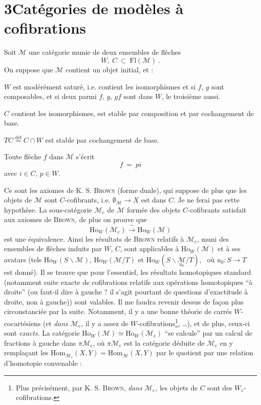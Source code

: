 \documentclass[11pt]{article}
\newcommand{\printedpage}[1]{\marginpar{\footnotesize p.~#1}}
\newcommand{\msp}[1]{\marginpar{\footnotesize [#1]}}
\newcommand{\M}{\mathcal{M}}
\newcommand{\Mc}{\mathcal{M}_{\mathrm{c}}}
\begin{document}
\section*{3\quad Catégories de modèles à cofibrations}

Soit $\M$ une catégorie munie de deux ensembles de flèches
\[ W,\ C\ \subset\ \mathrm{Fl}(\M)\ . \]
On suppose que $\M$ contient un objet initial, et :
\begin{description}[leftmargin=3em, labelwidth=2.5em]
\item[Cof$_0$] $W$ est modérément saturé, i.e. contient les isomorphismes et si $f$, $g$ sont composables, et si deux parmi $f$, $g$, $gf$ sont dans $W$, le troisième aussi.
\item[Cof$_1$] $C$ contient les isomorphismes, est stable par composition et par cochangement de base.
\item[Cof$_2$] $TC \overset{\text{déf}}{=} C \cap W$ est stable par cochangement de base.
\item[Cof$_3$] Toute flèche $f$ dans $\M$ s'écrit
\[ f \ = \ pi \]
avec $i \in C$, $p \in W$.
\end{description}
Ce sont les axiomes de K. S. \textsc{Brown} (forme duale), qui suppose de plus que les objets de $\M$ sont $C$-cofibrants, i.e. $\emptyset_{\M} \longrightarrow X$ est dans $C$. Je ne ferai pas cette hypothèse. La sous-catégorie $\Mc$ de $\M$ formée des \msp{40} objets $C$-cofibrants satisfait aux axiomes de \textsc{Brown}, de plus on prouve que
\[ \mathrm{Ho}_W(\Mc) \xrightarrow{\ \sim\ } \mathrm{Ho}_W(\M) \]
est une équivalence. Ainsi les résultats de \textsc{Brown} relatifs à $\Mc$, muni des ensembles de flèches induits par $W$, $C$, sont applicables à $\mathrm{Ho}_W(\M)$ et à ses avatars (tels $\mathrm{Ho}_W(S\backslash\M)$, $\mathrm{Ho}_W(\M/T)$ et $\mathrm{Ho}_W(S\backslash\underset{u_0}{\M}/T)$, \ où $u_0 : S \longrightarrow T$ est donné). Il se trouve que pour l'essentiel, les résultats homotopiques standard (notamment suite exacte de cofibrations relatifs aux opérations homotopiques “à droite” (ou faut-il dire à gauche ? il s'agit pourtant de questions d'exactitude à droite, non à gauche)) sont valables. Il me faudra revenir dessus de façon plus circonstanciée par la suite. Notamment, il y a une bonne théorie de carrés $W$-cocartésiens (et \textit{dans} $\Mc$\textit{,} il y a assez de $W$-cofibrations\footnote[14]{Plus précisément, par K. S. \textsc{Brown}, \textit{dans} $\Mc$\textit{,} les objets de $C$ sont des $W_{\mathrm{c}}$-cofibrations.}, \ldots),
\printedpage{22}
\msp{41}
et de plus, ceux-ci sont \textit{exacts.} La catégorie $\mathrm{Ho}_W(\M) \simeq \mathrm{Ho}_W(\Mc)$ “se calcule” par un calcul de fractions à gauche dans $\pi\Mc$, où $\pi\Mc$ est la catégorie déduite de $\Mc$ en y remplaçant les $\mathrm{Hom}_{\Mc}(X,Y) = \mathrm{Hom}_{\M}(X,Y)$ par le quotient par une relation d'homotopie convenable :
\end{document}
